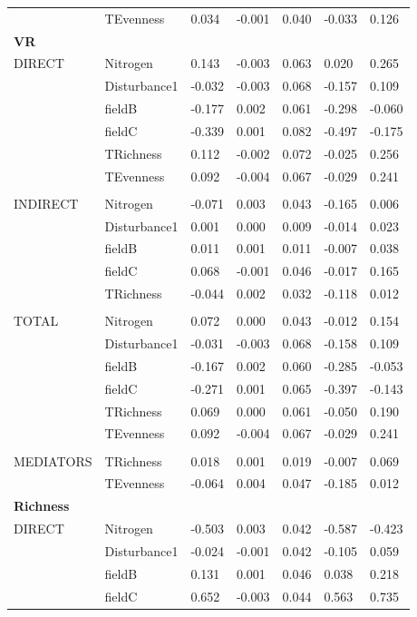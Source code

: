 \begin{longtable}[c]{l l l l l l l }
 & TEvenness & 0.034 & -0.001 & 0.040 & -0.033 & 0.126\\
\textbf{VR} &  &  &  &  &  &\\
\hline
 DIRECT & Nitrogen & 0.143 & -0.003 & 0.063 & 0.020 & 0.265\\
 & Disturbance1 & -0.032 & -0.003 & 0.068 & -0.157 & 0.109\\
 & fieldB & -0.177 & 0.002 & 0.061 & -0.298 & -0.060\\
 & fieldC & -0.339 & 0.001 & 0.082 & -0.497 & -0.175\\
 & TRichness & 0.112 & -0.002 & 0.072 & -0.025 & 0.256\\
 & TEvenness & 0.092 & -0.004 & 0.067 & -0.029 & 0.241\\
 & & & & & & \\
 INDIRECT & Nitrogen & -0.071 & 0.003 & 0.043 & -0.165 & 0.006\\
 & Disturbance1 & 0.001 & 0.000 & 0.009 & -0.014 & 0.023\\
 & fieldB & 0.011 & 0.001 & 0.011 & -0.007 & 0.038\\
 & fieldC & 0.068 & -0.001 & 0.046 & -0.017 & 0.165\\
 & TRichness & -0.044 & 0.002 & 0.032 & -0.118 & 0.012\\
 & & & & & & \\
 TOTAL & Nitrogen & 0.072 & 0.000 & 0.043 & -0.012 & 0.154\\
 & Disturbance1 & -0.031 & -0.003 & 0.068 & -0.158 & 0.109\\
 & fieldB & -0.167 & 0.002 & 0.060 & -0.285 & -0.053\\
 & fieldC & -0.271 & 0.001 & 0.065 & -0.397 & -0.143\\
 & TRichness & 0.069 & 0.000 & 0.061 & -0.050 & 0.190\\
 & TEvenness & 0.092 & -0.004 & 0.067 & -0.029 & 0.241\\
 & & & & & & \\
 MEDIATORS &TRichness & 0.018 & 0.001 & 0.019 & -0.007 & 0.069\\
 & TEvenness & -0.064 & 0.004 & 0.047 & -0.185 & 0.012\\
\textbf{Richness} &  &  &  &  &  &\\
\hline
 DIRECT & Nitrogen & -0.503 & 0.003 & 0.042 & -0.587 & -0.423\\
 & Disturbance1 & -0.024 & -0.001 & 0.042 & -0.105 & 0.059\\
 & fieldB & 0.131 & 0.001 & 0.046 & 0.038 & 0.218\\
 & fieldC & 0.652 & -0.003 & 0.044 & 0.563 & 0.735\\

\end{longtable}
